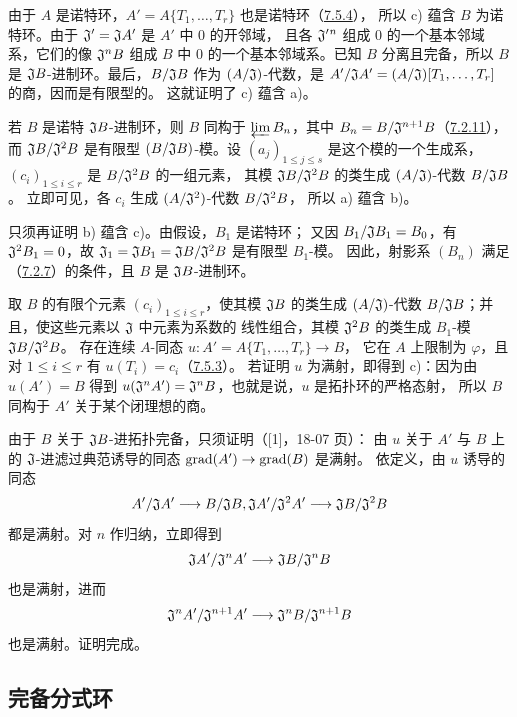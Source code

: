 由于 $A$ 是诺特环，$A'=A\{T_1,\ldots,T_r\}$ 也是诺特环（\hyperlink{para:0:7.5.4}{7.5.4}），
所以 c) 蕴含 $B$ 为诺特环。由于 $\mathfrak J'=\mathfrak J A'$ 是 $A'$ 中 $0$ 的开邻域，
且各 $\mathfrak J'{}^n$ 组成 $0$ 的一个基本邻域系，它们的像 $\mathfrak J^nB$
组成 $B$ 中 $0$ 的一个基本邻域系。已知 $B$ 分离且完备，所以 $B$ 是
$\mathfrak J B$-进制环。最后，$B/\mathfrak J B$ 作为 $(A/\mathfrak J)$-代数，是
$A'/\mathfrak J A'=(A/\mathfrak J)[T_1,\ldots,T_r]$ 的商，因而是有限型的。
这就证明了 c) 蕴含 a)。

若 $B$ 是诺特 $\mathfrak J B$-进制环，则 $B$ 同构于 $\varprojlim B_n$，其中
$B_n=B/\mathfrak J^{n+1}B$（\hyperlink{para:0:7.2.11}{7.2.11}），而 $\mathfrak J B/\mathfrak J^2B$ 是有限型
$(B/\mathfrak J B)$-模。设 $(a_j)_{1\leq j\leq s}$ 是这个模的一个生成系，
$(c_i)_{1\leq i\leq r}$ 是 $B/\mathfrak J^2B$ 的一组元素，
其模 $\mathfrak J B/\mathfrak J^2B$ 的类生成 $(A/\mathfrak J)$-代数 $B/\mathfrak J B$。
立即可见，各 $c_i$ 生成 $(A/\mathfrak J^2)$-代数 $B/\mathfrak J^2B$，
所以 a) 蕴含 b)。

只须再证明 b) 蕴含 c)。由假设，$B_1$ 是诺特环；
又因 $B_1/\mathfrak J B_1=B_0$，有 $\mathfrak J^2B_1=0$，故
$\mathfrak J_1=\mathfrak J B_1=\mathfrak J B/\mathfrak J^2B$ 是有限型 $B_1$-模。
因此，射影系 $(B_n)$ 满足（\hyperlink{para:0:7.2.7}{7.2.7}）的条件，且 $B$ 是 $\mathfrak J B$-进制环。

取 $B$ 的有限个元素 $(c_i)_{1\leq i\leq r}$，使其模 $\mathfrak J B$ 的类生成
$(A/\mathfrak J)$-代数 $B/\mathfrak J B$；并且，使这些元素以 $\mathfrak J$ 中元素为系数的
线性组合，其模 $\mathfrak J^2B$ 的类生成 $B_1$-模 $\mathfrak J B/\mathfrak J^2B$。
存在连续 $A$-同态 $u:A'=A\{T_1,\ldots,T_r\}\to B$，
它在 $A$ 上限制为 $\varphi$，且对 $1\leq i\leq r$ 有 $u(T_i)=c_i$（\hyperlink{para:0:7.5.3}{7.5.3}）。
若证明 $u$ 为满射，即得到 c)：因为由 $u(A')=B$ 得到
$u(\mathfrak J^nA')=\mathfrak J^nB$，也就是说，$u$ 是拓扑环的严格态射，
所以 $B$ 同构于 $A'$ 关于某个闭理想的商。

由于 $B$ 关于 $\mathfrak J B$-进拓扑完备，只须证明（[1]，18-07 页）：
由 $u$ 关于 $A'$ 与 $B$ 上的 $\mathfrak J$-进滤过典范诱导的同态
$\operatorname{grad}(A')\to\operatorname{grad}(B)$ 是满射。
依定义，由 $u$ 诱导的同态
\[
 A'/\frJ A'\longrightarrow B/\frJ B,
 \qquad
 \frJ A'/\frJ^2A'\longrightarrow\frJ B/\frJ^2B
\]
都是满射。对 $n$ 作归纳，立即得到
\[
 \mathfrak J A'/\mathfrak J^nA'\longrightarrow\mathfrak J B/\mathfrak J^nB
\]
也是满射，进而
\[
 \mathfrak J^nA'/\mathfrak J^{n+1}A'\longrightarrow
 \mathfrak J^nB/\mathfrak J^{n+1}B
\]
也是满射。证明完成。



\par

\subsection{完备分式环}\hypertarget{heading:0:7.6}{}

